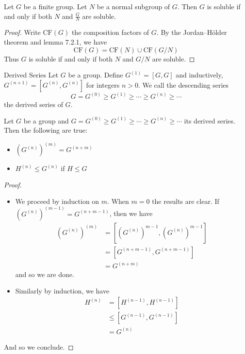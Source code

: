 \documentclass[a4paper]{article}
\begin{document}
\begin{lmm}{}{} Let $G$ be a finite group. Let $N$ be a normal subgroup of $G$. Then $G$ is soluble if and only if both $N$ and $\frac{G}{N}$ are soluble. 
\begin{proof}
Write $\text{CF}(G)$ the composition factors of $G$. By the Jordan–Hölder theorem and lemma 7.2.1, we have $$\text{CF}(G)=\text{CF}(N)\cup\text{CF}(G/N)$$ Thus $G$ is soluble if and only if both $N$ and $G/N$ are soluble. 
\end{proof}
\end{lmm}

\begin{defn}{Derived Series}{} Let $G$ be a group. Define $G^{(1)}=[G,G]$ and inductively, $G^{(n+1)}=[G^{(n)},G^{(n)}]$ for integers $n>0$. We call the descending series $$G=G^{(0)}\geq G^{(1)}\geq \cdots\geq G^{(n)}\geq \cdots$$ the derived series of $G$. 
\end{defn}

\begin{lmm}{}{} Let $G$ be a group and $G=G^{(0)}\geq G^{(1)}\geq \cdots\geq G^{(n)}\geq \cdots$ its derived series. Then the following are true: 
\begin{itemize}
\item $(G^{(n)})^{(m)}=G^{(n+m)}$
\item $H^{(n)}\leq G^{(n)}$ if $H\leq G$
\end{itemize} 
\begin{proof}~\\
\begin{itemize}
\item We proceed by induction on $m$. When $m=0$ the results are clear. If $(G^{(n)})^{(m-1)}=G^{(n+m-1)}$, then we have 
\begin{align*}
(G^{(n)})^{(m)}&=[(G^{(n)})^{m-1},(G^{(n)})^{m-1}]\\
&=[G^{(n+m-1)},G^{(n+m-1)}]\\
&=G^{(n+m)}
\end{align*} and so we are done. 
\item Similarly by induction, we have 
\begin{align*}
H^{(n)}&=[H^{(n-1)},H^{(n-1)}]\\
&\leq[G^{(n-1)},G^{(n-1)}]\\
&=G^{(n)}
\end{align*}
\end{itemize}
And so we conclude. 
\end{proof}
\end{lmm}
\end{document}

